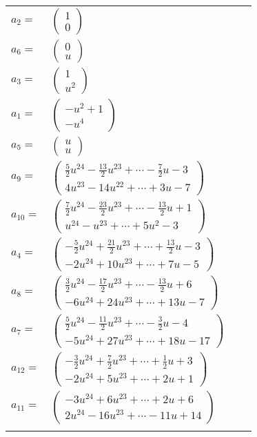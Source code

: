 \documentclass[1p]{elsarticle_modified}
\theoremstyle{definition}
\begin{document}
\begin{tabular}{m{7pt} m{180pt} m{7pt} m{180pt} }
\flushright $a_{2}=$&$\begin{pmatrix}1\\0\end{pmatrix}$ \\
\flushright $a_{6}=$&$\begin{pmatrix}0\\u\end{pmatrix}$ \\
\flushright $a_{3}=$&$\begin{pmatrix}1\\u^2\end{pmatrix}$ \\
\flushright $a_{1}=$&$\begin{pmatrix}- u^2+1\\- u^4\end{pmatrix}$ \\
\flushright $a_{5}=$&$\begin{pmatrix}u\\u\end{pmatrix}$ \\
\flushright $a_{9}=$&$\begin{pmatrix}\frac{5}{2} u^{24}-\frac{13}{2} u^{23}+\cdots-\frac{7}{2} u-3\\4 u^{23}-14 u^{22}+\cdots+3 u-7\end{pmatrix}$ \\
\flushright $a_{10}=$&$\begin{pmatrix}\frac{7}{2} u^{24}-\frac{23}{2} u^{23}+\cdots-\frac{13}{2} u+1\\u^{24}- u^{23}+\cdots+5 u^2-3\end{pmatrix}$ \\
\flushright $a_{4}=$&$\begin{pmatrix}-\frac{5}{2} u^{24}+\frac{21}{2} u^{23}+\cdots+\frac{13}{2} u-3\\-2 u^{24}+10 u^{23}+\cdots+7 u-5\end{pmatrix}$ \\
\flushright $a_{8}=$&$\begin{pmatrix}\frac{3}{2} u^{24}-\frac{17}{2} u^{23}+\cdots-\frac{13}{2} u+6\\-6 u^{24}+24 u^{23}+\cdots+13 u-7\end{pmatrix}$ \\
\flushright $a_{7}=$&$\begin{pmatrix}\frac{5}{2} u^{24}-\frac{11}{2} u^{23}+\cdots-\frac{3}{2} u-4\\-5 u^{24}+27 u^{23}+\cdots+18 u-17\end{pmatrix}$ \\
\flushright $a_{12}=$&$\begin{pmatrix}-\frac{3}{2} u^{24}+\frac{7}{2} u^{23}+\cdots+\frac{1}{2} u+3\\-2 u^{24}+5 u^{23}+\cdots+2 u+1\end{pmatrix}$ \\
\flushright $a_{11}=$&$\begin{pmatrix}-3 u^{24}+6 u^{23}+\cdots+2 u+6\\2 u^{24}-16 u^{23}+\cdots-11 u+14\end{pmatrix}$\\&\end{tabular}
\end{document}
